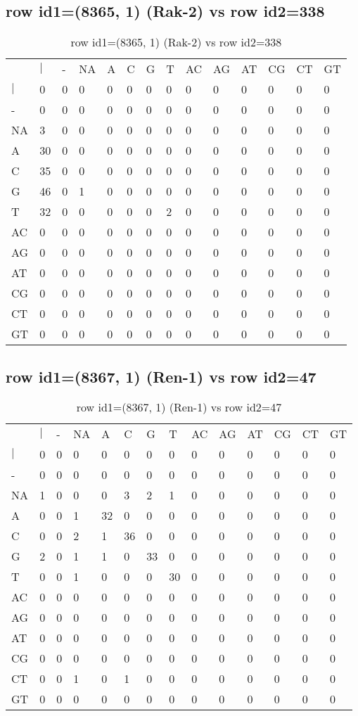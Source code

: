 \subsection{row id1=(8365, 1) (Rak-2) vs row id2=338}
\begin{center}
\begin{longtable}{|l|l|l|l|l|l|l|l|l|l|l|l|l|l|}
\caption{row id1=(8365, 1) (Rak-2) vs row id2=338} \label{table_dm590}\\
\hline
\\
\hline
&$|$&-&NA&A&C&G&T&AC&AG&AT&CG&CT&GT\\
$|$&0&0&0&0&0&0&0&0&0&0&0&0&0\\
-&0&0&0&0&0&0&0&0&0&0&0&0&0\\
NA&3&0&0&0&0&0&0&0&0&0&0&0&0\\
A&30&0&0&0&0&0&0&0&0&0&0&0&0\\
C&35&0&0&0&0&0&0&0&0&0&0&0&0\\
G&46&0&1&0&0&0&0&0&0&0&0&0&0\\
T&32&0&0&0&0&0&2&0&0&0&0&0&0\\
AC&0&0&0&0&0&0&0&0&0&0&0&0&0\\
AG&0&0&0&0&0&0&0&0&0&0&0&0&0\\
AT&0&0&0&0&0&0&0&0&0&0&0&0&0\\
CG&0&0&0&0&0&0&0&0&0&0&0&0&0\\
CT&0&0&0&0&0&0&0&0&0&0&0&0&0\\
GT&0&0&0&0&0&0&0&0&0&0&0&0&0\\
\hline
\end{longtable}
\end{center}

\subsection{row id1=(8367, 1) (Ren-1) vs row id2=47}
\begin{center}
\begin{longtable}{|l|l|l|l|l|l|l|l|l|l|l|l|l|l|}
\caption{row id1=(8367, 1) (Ren-1) vs row id2=47} \label{table_dm592}\\
\hline
\\
\hline
&$|$&-&NA&A&C&G&T&AC&AG&AT&CG&CT&GT\\
$|$&0&0&0&0&0&0&0&0&0&0&0&0&0\\
-&0&0&0&0&0&0&0&0&0&0&0&0&0\\
NA&1&0&0&0&3&2&1&0&0&0&0&0&0\\
A&0&0&1&32&0&0&0&0&0&0&0&0&0\\
C&0&0&2&1&36&0&0&0&0&0&0&0&0\\
G&2&0&1&1&0&33&0&0&0&0&0&0&0\\
T&0&0&1&0&0&0&30&0&0&0&0&0&0\\
AC&0&0&0&0&0&0&0&0&0&0&0&0&0\\
AG&0&0&0&0&0&0&0&0&0&0&0&0&0\\
AT&0&0&0&0&0&0&0&0&0&0&0&0&0\\
CG&0&0&0&0&0&0&0&0&0&0&0&0&0\\
CT&0&0&1&0&1&0&0&0&0&0&0&0&0\\
GT&0&0&0&0&0&0&0&0&0&0&0&0&0\\
\hline
\end{longtable}
\end{center}

